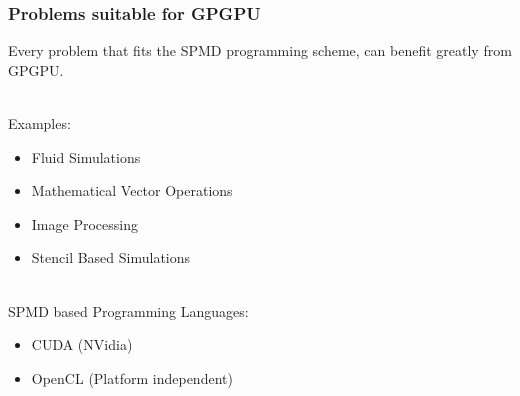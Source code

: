 \documentclass{beamer}
\begin{document}
\begin{frame}
    \frametitle{Problems suitable for GPGPU}
    Every problem that fits the \alert{SPMD} programming scheme, can benefit greatly
    from GPGPU.
    
    ~\\ 
    Examples:
    \begin{itemize}
        \item Fluid Simulations
        \item Mathematical Vector Operations
        \item Image Processing
        \item Stencil Based Simulations 
    \end{itemize}
    
    ~\\
    SPMD based Programming Languages:
    \begin{itemize}
        \item CUDA (NVidia)
        \item OpenCL (Platform independent)
    \end{itemize}
\end{frame}
\end{document}
